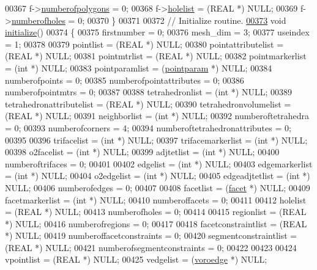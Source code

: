 \begin{DoxyCode}
00367     f->\hyperlink{structtetgenio_1_1facet_a845d93a1341532b2f0de8b1e75a5d0bb}{numberofpolygons} = 0;
00368     f->\hyperlink{structtetgenio_1_1facet_aecc34fbcd7087b45baecf2ba43d57757}{holelist} = (REAL *) NULL;
00369     f->\hyperlink{structtetgenio_1_1facet_acc9857df4007aa20199f8979353339c7}{numberofholes} = 0;
00370   \}
00371 
00372   \textcolor{comment}{// Initialize routine.}
\hypertarget{tetgen_8h_source.tex_l00373}{}\hyperlink{classtetgenio_ac164a365a6a479bb31cd40443f5bd989}{00373}   \textcolor{keywordtype}{void} \hyperlink{classtetgenio_ac164a365a6a479bb31cd40443f5bd989}{initialize}()
00374   \{
00375     firstnumber = 0;
00376     mesh\_dim = 3;
00377     useindex = 1;
00378 
00379     pointlist = (REAL *) NULL;
00380     pointattributelist = (REAL *) NULL;
00381     pointmtrlist = (REAL *) NULL;
00382     pointmarkerlist = (\textcolor{keywordtype}{int} *) NULL;
00383     pointparamlist = (\hyperlink{structtetgenio_1_1pointparam}{pointparam} *) NULL;
00384     numberofpoints = 0;
00385     numberofpointattributes = 0;
00386     numberofpointmtrs = 0;
00387 
00388     tetrahedronlist = (\textcolor{keywordtype}{int} *) NULL;
00389     tetrahedronattributelist = (REAL *) NULL;
00390     tetrahedronvolumelist = (REAL *) NULL;
00391     neighborlist = (\textcolor{keywordtype}{int} *) NULL;
00392     numberoftetrahedra = 0;
00393     numberofcorners = 4; 
00394     numberoftetrahedronattributes = 0;
00395 
00396     trifacelist = (\textcolor{keywordtype}{int} *) NULL;
00397     trifacemarkerlist = (\textcolor{keywordtype}{int} *) NULL;
00398     o2facelist = (\textcolor{keywordtype}{int} *) NULL;
00399     adjtetlist = (\textcolor{keywordtype}{int} *) NULL;
00400     numberoftrifaces = 0; 
00401 
00402     edgelist = (\textcolor{keywordtype}{int} *) NULL;
00403     edgemarkerlist = (\textcolor{keywordtype}{int} *) NULL;
00404     o2edgelist = (\textcolor{keywordtype}{int} *) NULL;
00405     edgeadjtetlist = (\textcolor{keywordtype}{int} *) NULL;
00406     numberofedges = 0;
00407 
00408     facetlist = (\hyperlink{structtetgenio_1_1facet}{facet} *) NULL;
00409     facetmarkerlist = (\textcolor{keywordtype}{int} *) NULL;
00410     numberoffacets = 0; 
00411 
00412     holelist = (REAL *) NULL;
00413     numberofholes = 0;
00414 
00415     regionlist = (REAL *) NULL;
00416     numberofregions = 0;
00417 
00418     facetconstraintlist = (REAL *) NULL;
00419     numberoffacetconstraints = 0;
00420     segmentconstraintlist = (REAL *) NULL;
00421     numberofsegmentconstraints = 0;
00422 
00423 
00424     vpointlist = (REAL *) NULL;
00425     vedgelist = (\hyperlink{structtetgenio_1_1voroedge}{voroedge} *) NULL;

\end{DoxyCode}

